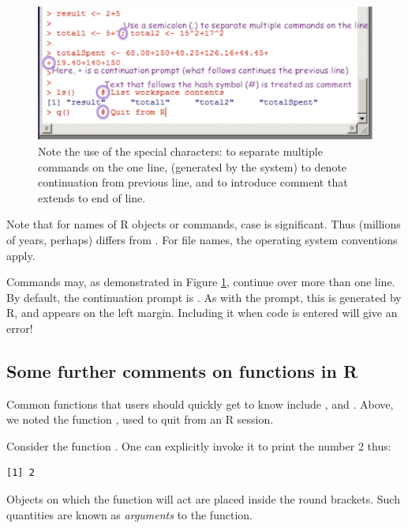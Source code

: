 \begin{figure}
\includegraphics{figs-inc/01i-cmds1.jpg}
\caption{Note the use of the special characters: \txtt{;} to separate
  multiple commands on the one line, \txtt{+} (generated by the
  system) to denote continuation from previous line, and \txtt{\#} to
  introduce comment that extends to end of line.\label{fig:cmds1}}
\end{figure}

Note that for names of R objects or commands, case is significant.
Thus  (millions of years, perhaps) differs from .
For file names, the operating system
conventions apply.

Commands may, as demonstrated in Figure \ref{fig:cmds1}, continue over
more than one line. By default, the continuation prompt is \txtt{+}.
As with the \txtt{>} prompt, this is generated by R, and appears on
the left margin.  Including it when code is entered will give an
error!  

\subsection{Some further comments on functions in R}

 Common functions that users
  should quickly get to know include , 
  and .  Above, we noted the function , used
  to quit from an R session.

Consider the function . One can explicitly invoke it to print the
number 2 thus:
\begin{knitrout}
\color{fgcolor}\begin{kframe}
\begin{alltt}
\hlstd{(}\hlstd{)}
\end{alltt}
\begin{verbatim}
[1] 2
\end{verbatim}
\end{kframe}
\end{knitrout}
Objects on which the function will act are placed inside the round
brackets.  Such quantities are known as {\em arguments} to the function.

